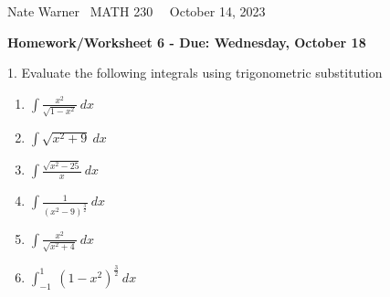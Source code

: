 \documentclass{report}
\title{\Huge{}}
\author{\huge{Nathan Warner}}
\date{\huge{}}
\begin{document}
    \pagebreak \bigbreak \noindent
    Nate Warner \ \quad \quad \quad \quad \quad \quad \quad \quad \quad \quad \quad \quad \quad \quad \quad \quad \quad  MATH 230 \quad  \quad \quad \quad \quad \quad \quad \quad \quad \ \ \quad \quad October 14, 2023
    \begin{center}
        \textbf{Homework/Worksheet 6 - Due: Wednesday, October 18}
    \end{center}
    \bigbreak \noindent 
    \begin{mdframed}
        1. Evaluate the following integrals using trigonometric substitution
        \begin{enumerate}[label=(\alph*)]
            \item $\int \frac{x^{2}}{\sqrt{1-x^{2}}}\ dx$ 
            \item $\int \sqrt{x^{2}+9}\ dx $ 
            \item $\int \frac{\sqrt{x^{2}-25}}{x}\ dx $
            \item $\int \frac{1}{(x^{2}-9)^{\frac{3}{2}}}\ dx $
            \item $\int \frac{x^{2}}{\sqrt{x^{2}+4}}\ dx$
            \item $\int_{-1}^{1}\ (1-x^{2})^{\frac{3}{2}}\ dx $ 
        \end{enumerate}
    \end{mdframed}
\end{document}
